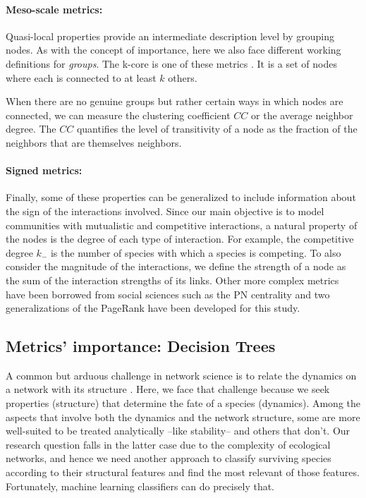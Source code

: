 \paragraph{Meso-scale metrics:} Quasi-local properties provide an intermediate description level by grouping nodes. As with the concept of importance, here we also face different working definitions for \textit{groups}. The k-core is one of these  metrics \cite{Morone2019TheEcosystems}. It is a set of nodes where each is connected to at least $k$ others. 

When there are no genuine groups but rather certain ways in which nodes are connected, we can measure the clustering coefficient $CC$ or the average neighbor degree. The $CC$ quantifies the level of transitivity of a node as the fraction of the neighbors that are themselves neighbors.

\paragraph{Signed metrics:}Finally, some of these properties can be generalized to include information about the sign of the interactions involved. Since our main objective is to model communities with mutualistic and competitive interactions, a natural property of the nodes is the degree of each type of interaction. For example, the competitive degree $k_-$ is the number of species with which a species is competing. To also consider the magnitude of the interactions, we define the strength of a node as the sum of the interaction strengths of its links. Other more complex metrics have been borrowed from social sciences such as the PN centrality and two generalizations of the PageRank have been developed for this study.

\subsection{Metrics' importance: Decision Trees} \label{chp2:2.4}
A common but arduous challenge in network science is to relate the dynamics on a network with its structure \cite{Newman2010,Holme2021NetworksConsequences}. Here, we face that challenge because we seek properties (structure) that determine the fate of a species (dynamics). Among the aspects that involve both the dynamics and the network structure, some are more well-suited to be treated analytically --like stability-- and others that don't. Our research question falls in the latter case due to the complexity of ecological networks, and hence we need another approach to classify  surviving species according to their structural features and find the most relevant of those features. Fortunately, machine learning classifiers can do precisely that.  \\

